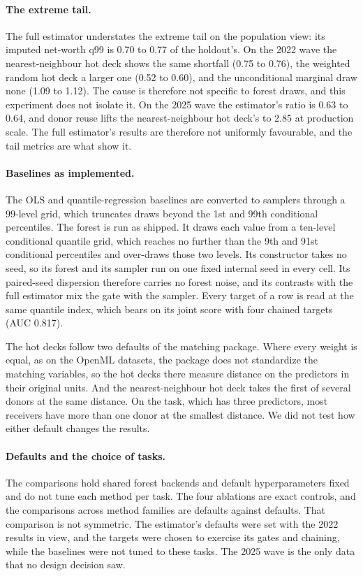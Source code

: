 \paragraph{The extreme tail.} The full estimator understates the extreme
tail on the population view: its imputed net-worth q99 is 0.70 to 0.77 of
the holdout's. On the 2022 wave the nearest-neighbour hot deck shows the
same shortfall (0.75 to 0.76), the weighted random hot deck a larger one
(0.52 to 0.60), and the unconditional marginal draw none (1.09 to 1.12). The
cause is therefore not specific to forest draws, and this experiment does
not isolate it. On the 2025 wave the estimator's ratio is 0.63 to 0.64, and
donor reuse lifts the nearest-neighbour hot deck's to 2.85 at production
scale. The full estimator's results are therefore not uniformly favourable,
and the tail metrics are what show it.

\paragraph{Baselines as implemented.} The OLS and quantile-regression
baselines are converted to samplers through a 99-level grid, which truncates
draws beyond the 1st and 99th conditional percentiles. The \microimpute{}
forest is run as shipped. It draws each value from a ten-level conditional
quantile grid, which reaches no further than the 9th and 91st conditional
percentiles and over-draws those two levels. Its constructor takes no seed,
so its forest and its sampler run on one fixed internal seed in every cell.
Its paired-seed dispersion therefore carries no forest noise, and its
contrasts with the full estimator mix the gate with the sampler. Every
target of a row is read at the same quantile index, which bears on its joint
score with four chained targets (AUC 0.817).

The hot decks follow two defaults of the matching package. Where every
weight is equal, as on the OpenML datasets, the package does not standardize
the matching variables, so the hot decks there measure distance on the
predictors in their original units. And the nearest-neighbour hot deck takes
the first of several donors at the same distance. On the \cps{} task, which
has three predictors, most receivers have more than one donor at the
smallest distance. We did not test how either default changes the results.

\paragraph{Defaults and the choice of tasks.} The comparisons hold shared
forest backends and default hyperparameters fixed and do not tune each
method per task. The four ablations are exact controls, and the comparisons
across method families are defaults against defaults. That comparison is not
symmetric. The estimator's defaults were set with the 2022 \scf{} results in
view, and the targets were chosen to exercise its gates and chaining, while
the baselines were not tuned to these tasks. The 2025 wave is the only
\scf{} data that no design decision saw.

